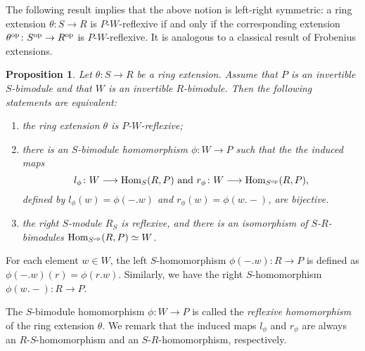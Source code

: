 \documentclass[a4paper]{amsart}
\newtheorem{prop}[thm]{Proposition}
\theoremstyle{definition}
\theoremstyle{remark}
\numberwithin{equation}{section}
\begin{document}
The following result implies that the above notion is left-right symmetric: a ring extension $\theta\colon S\rightarrow R$ is
$P$-$W$-reflexive if and only if the corresponding extension $\theta^{\rm op}\colon S^{\rm op}\rightarrow R^{\rm op}$ is $P$-$W$-reflexive. It is analogous to a classical result \cite[Theorem 1.2]{Kad} of Frobenius extensions.

\begin{prop}\label{prop:symm}
Let $\theta\colon S\rightarrow R$ be a ring extension. Assume that $P$ is an invertible $S$-bimodule and that $W$ is an invertible $R$-bimodule. Then the following statements are equivalent:
\begin{enumerate}
\item the ring extension $\theta$ is $P$-$W$-reflexive;
\item there is an $S$-bimodule homomorphism $\phi\colon W\rightarrow P$ such that the the induced maps
$$l_\phi\colon W\longrightarrow {\rm Hom}_S(R, P) \mbox{ and } r_\phi\colon {W} \longrightarrow {\rm Hom}_{S^{\rm op}}(R, P),$$
defined by $l_\phi(w)=\phi(-.w)$ and $r_\phi(w)=\phi(w.-)$, are bijective.
\item the right $S$-module $R_S$ is reflexive, and there is an isomorphism of $S$-$R$-bimodules ${\rm Hom}_{S^{\rm op}}(R, P) \simeq W$.
\end{enumerate}
\end{prop}

For each element $w\in W$, the left $S$-homomorphism $\phi(-.w)\colon R\rightarrow P$ is
defined as $\phi(-.w)(r)=\phi(r.w)$. Similarly, we have the right $S$-homomorphism $\phi(w.-)\colon R\rightarrow P$.

The $S$-bimodule homomorphism $\phi\colon W\rightarrow P$ is called the \emph{reflexive homomorphism} of the
ring extension $\theta$. We remark that the induced maps $l_\phi$ and $r_\phi$ are always an $R$-$S$-homomorphism and
an $S$-$R$-homomorphism, respectively.
\end{document}

